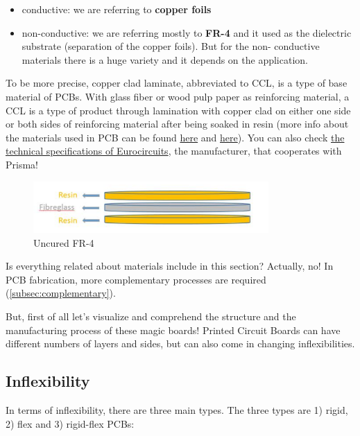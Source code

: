 \documentclass[final]{cubedoc}
\begin{document}
	\begin{itemize}
		\item conductive: we are referring to \textbf{copper foils}
		\item non-conductive: we are referring mostly to \textbf{FR-4} and it used as the dielectric substrate (separation of the copper foils). But for the non- conductive materials there is a huge variety and it depends on the application.
	\end{itemize}
	
	To be more precise, copper clad laminate, abbreviated to CCL, is a type of base material of PCBs. With glass fiber or wood pulp paper as reinforcing material, a CCL is a type of product through lamination with copper clad on either one side or both sides of reinforcing material after being soaked in resin (more info about the materials used in PCB can be found \href{https://www.pcbcart.com/article/content/copper-clad-laminate.html}{here} and \href{https://www.pcbcart.com/pcb-capability/pcb-materials.html}{here}). You can also check \href{https://www.eurocircuits.com/technical-specifications-of-all-eurocircuits-prototype-small-volume-services-european-origin/}{the technical specifications of Eurocircuits}, the manufacturer, that cooperates with Prisma!
	
	\begin{figure}[h]
		\centering
		\includegraphics[width=0.8\textwidth,height=0.8\textheight,keepaspectratio]{assets/fiberglass_resin.png}
		\caption{Uncured FR-4}
	\end{figure}
	
	Is everything related about materials include in this section? Actually, no! In PCB fabrication, more complementary processes are required (\autoref{subsec:complementary}).
	
	But, first of all let’s visualize and comprehend the structure and the manufacturing process of these magic boards! Printed Circuit Boards can have different numbers of layers and sides, but can also come in changing inflexibilities. 
	
	\subsection{Inflexibility}
	In terms of inflexibility, there are three main types. The three types are 1) rigid, 2) flex and 3) rigid-flex PCBs:
	
\end{document}
